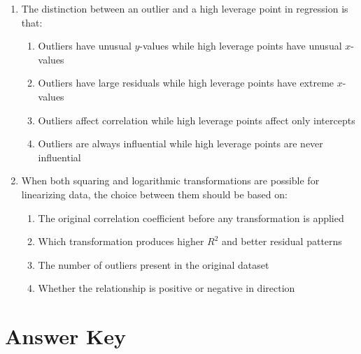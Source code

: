 \documentclass[11pt]{article}
\begin{document}
\begin{enumerate}
\item The distinction between an outlier and a high leverage point in regression is that:
\begin{enumerate}[label=(\Alph*)]
\item Outliers have unusual $y$-values while high leverage points have unusual $x$-values
\item Outliers have large residuals while high leverage points have extreme $x$-values
\item Outliers affect correlation while high leverage points affect only intercepts
\item Outliers are always influential while high leverage points are never influential
\end{enumerate}

\item When both squaring and logarithmic transformations are possible for linearizing data, the choice between them should be based on:
\begin{enumerate}[label=(\Alph*)]
\item The original correlation coefficient before any transformation is applied
\item Which transformation produces higher $R^2$ and better residual patterns
\item The number of outliers present in the original dataset
\item Whether the relationship is positive or negative in direction
\end{enumerate}

\end{enumerate}

\newpage
\section*{Answer Key}
\end{document}
